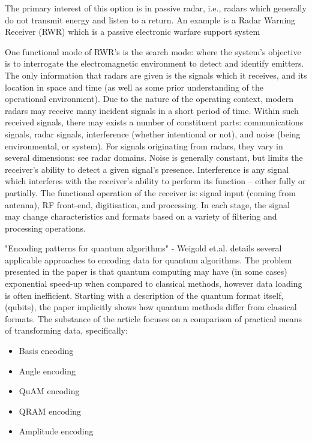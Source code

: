 The primary interest of this option is in passive radar, i.e., radars which generally do not transmit energy and listen to a return. An example is a Radar Warning Receiver (RWR) which is a passive electronic warfare support system \cite{avionics_department_electronic_2013}

One functional mode of RWR's is the search mode: where the system’s objective is to interrogate the electromagnetic environment to detect and identify emitters. The only information that radars are given is the signals which it receives, and its location in space and time (as well as some prior understanding of the operational environment). Due to the nature of the operating context, modern radars may receive many incident signals in a short period of time. Within such received signals, there may exists a number of constituent parts: communications signals, radar signals, interference (whether intentional or not), and noise (being environmental, or system). For signals originating from radars, they vary in several dimensions: see radar domains. Noise is generally constant, but limits the receiver’s ability to detect a given signal’s presence. Interference is any signal which interferes with the receiver’s ability to perform its function – either fully or partially. The functional operation of the receiver is: signal input (coming from antenna), RF front-end, digitisation, and processing. In each stage, the signal may change characteristics and formats based on a variety of filtering and processing operations. \cite{stimson_introduction_1998}

"Encoding patterns for quantum algorithms" - Weigold et.al. \cite{weigold_encoding_2021} details several applicable approaches to encoding data for quantum algorithms. The problem presented in the paper is that quantum computing may have (in some cases) exponential speed-up when compared to classical methods, however data loading is often inefficient. Starting with a description of the quantum format itself, (qubits), the paper implicitly shows how quantum methods differ from classical formats. The substance of the article focuses on a comparison of practical means of transforming data, specifically:
\begin{itemize}
    \item Basis encoding
    \item Angle encoding
    \item QuAM encoding 
    \item QRAM encoding
    \item Amplitude encoding
\end{itemize}

